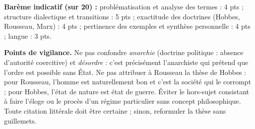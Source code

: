 \documentclass[11pt]{article}
\begin{document}
\begin{corrige}
\textbf{Barème indicatif (sur 20) :} problématisation et analyse des termes : 4 pts ; structure dialectique et transitions : 5 pts ; exactitude des doctrines (Hobbes, Rousseau, Marx) : 4 pts ; pertinence des exemples et synthèse personnelle : 4 pts ; langue : 3 pts.

\textbf{Points de vigilance.} Ne pas confondre \emph{anarchie} (doctrine politique : absence d'autorité coercitive) et \emph{désordre} : c'est précisément l'anarchiste qui prétend que l'ordre est possible sans État. Ne pas attribuer à Rousseau la thèse de Hobbes : pour Rousseau, l'homme est naturellement bon et c'est la société qui le corrompt ; pour Hobbes, l'état de nature est état de guerre. Éviter le hors-sujet consistant à faire l'éloge ou le procès d'un régime particulier sans concept philosophique. Toute citation littérale doit être certaine ; sinon, reformuler la thèse sans guillemets.
\end{corrige}
\end{document}
